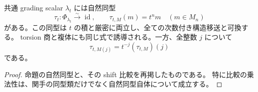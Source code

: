 \begin{lemma}
\label{mbza:lem:scalar}
共通 grading scalar $\lambda_t$ には自然同型
\begin{equation}\label{mbza:eq:scalar-trivialization}
 \tau_t:\Phi_{\lambda_t}\xrightarrow{\sim}\operatorname{id},
 \qquad \tau_{t,M}(m)=t^n m\quad(m\in M_n)
\end{equation}
がある。この同型は $t$ の積と厳密に両立し、全ての次数付き構造移送と可換する。
torsion 商と複体にも同じ式で誘導される。一方、全整数 $j$ について
\begin{equation}\label{mbza:eq:shift-weight}
 \tau_{t,M(j)}=t^{-j}(\tau_{t,M})(j)
\end{equation}
である。
\end{lemma}
\begin{proof}
命題の自然同型と、その shift 比較を再掲したものである。
特に比較の乗法性は、関手の同型類だけでなく自然同型自体について成立する。
\end{proof}

